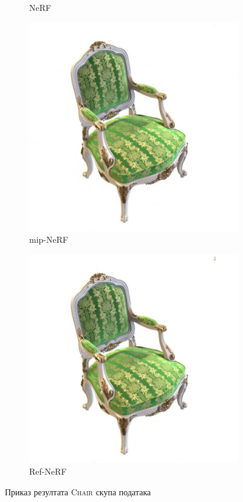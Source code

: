 \documentclass[12pt, a4paper, twoside]{book}
\numberwithin{equation}{chapter}
\numberwithin{theorem}{section}
\numberwithin{definition}{section}
\numberwithin{definitionChapter}{chapter}
\begin{document}
\begin{figure}[H]
\begin{subfigure}{0.475\textwidth}
			\caption{NeRF}
		\end{subfigure}
		\begin{subfigure}{0.475\textwidth}
			\centering
			\includegraphics[scale=0.25]{img/mipnerf/mipnerf_chair_38.jpg}
			\caption{mip-NeRF}
		\end{subfigure}
		\begin{subfigure}{0.475\textwidth}
			\centering
			\includegraphics[scale=0.25]{img/refnerf/refnerf_chair_38.jpg}
			\caption{Ref-NeRF}
		\end{subfigure}
		\caption{Приказ резултата \textsc{Chair} скупа података}
		\label{fig-chair-results}
	\end{figure}
\end{document}
